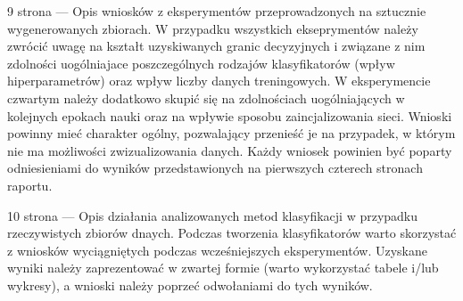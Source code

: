 \documentclass[12pt]{article}
\begin{document}
\clearpage

9 strona --- Opis wniosków z eksperymentów przeprowadzonych na sztucznie wygenerowanych zbiorach. W przypadku wszystkich ekseprymentów należy zwrócić uwagę na kształt uzyskiwanych granic decyzyjnych i związane z nim zdolności uogólniajace poszczególnych rodzajów klasyfikatorów (wpływ hiperparametrów) oraz wpływ liczby danych treningowych. W eksperymencie czwartym należy dodatkowo skupić się na zdolnościach uogólniających w kolejnych epokach nauki oraz na wpływie sposobu zaincjalizowania sieci. Wnioski powinny mieć charakter ogólny, pozwalający przenieść je na przypadek, w którym nie ma możliwości zwizualizowania danych. Każdy wniosek powinien być poparty odniesieniami do wyników przedstawionych na pierwszych czterech stronach raportu.

\clearpage

10 strona --- Opis działania analizowanych metod klasyfikacji w przypadku rzeczywistych zbiorów dnaych. Podczas tworzenia klasyfikatorów warto skorzystać z wniosków wyciągniętych podczas wcześniejszych eksperymentów. Uzyskane wyniki należy zaprezentować w zwartej formie (warto wykorzystać tabele i/lub wykresy), a wnioski należy poprzeć odwołaniami do tych wyników.
\end{document}

